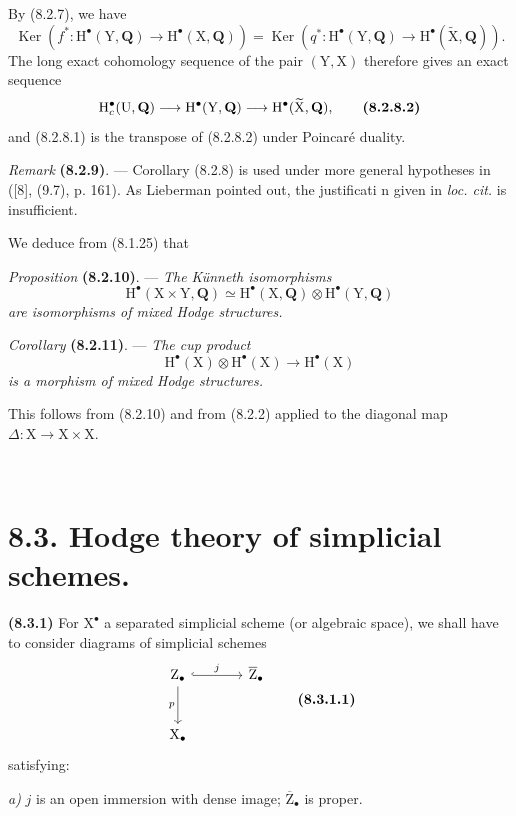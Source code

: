 \documentclass[11pt,leqno]{article}
\newcommand{\Page}[1]{\ifvmode\noindent\else\unskip\ \fi{\footnotesize\textcolor{gray}{[p.\,#1]}}\ \ignorespaces}
\begin{document}
By (8.2.7), we have
\[
\operatorname{Ker}(f^*:\mathrm{H}^\bullet(\mathrm{Y},\mathbf{Q})
 \to\mathrm{H}^\bullet(\mathrm{X},\mathbf{Q}))
=
\operatorname{Ker}(q^*:\mathrm{H}^\bullet(\mathrm{Y},\mathbf{Q})
 \to\mathrm{H}^\bullet(\widetilde{\mathrm{X}},\mathbf{Q})).
\]
The long exact cohomology sequence of the pair \((\mathrm{Y},\mathrm{X})\) therefore gives an exact sequence
\[
\mathrm{H}_c^\bullet(\mathrm{U},\mathbf{Q})
\longrightarrow\mathrm{H}^\bullet(\mathrm{Y},\mathbf{Q})
\longrightarrow\mathrm{H}^\bullet(\widetilde{\mathrm{X}},\mathbf{Q}),
\tag*{\textbf{(8.2.8.2)}}
\]
and (8.2.8.1) is the transpose of (8.2.8.2) under Poincaré duality.

\textit{Remark} \textbf{(8.2.9)}. — Corollary (8.2.8) is used under more general hypotheses in ([8], (9.7), p. 161). As Lieberman pointed out, the justificati n given in \textit{loc. cit.} is insufficient.

We deduce from (8.1.25) that

\textit{Proposition} \textbf{(8.2.10)}. — \textit{The Künneth isomorphisms}
\[
\mathrm{H}^\bullet(\mathrm{X}\times\mathrm{Y},\mathbf{Q})
\simeq
\mathrm{H}^\bullet(\mathrm{X},\mathbf{Q})
\otimes\mathrm{H}^\bullet(\mathrm{Y},\mathbf{Q})
\]
\textit{are isomorphisms of mixed Hodge structures.}

\textit{Corollary} \textbf{(8.2.11)}. — \textit{The cup product}
\[
\mathrm{H}^\bullet(\mathrm{X})\otimes\mathrm{H}^\bullet(\mathrm{X})
\longrightarrow\mathrm{H}^\bullet(\mathrm{X})
\]
\textit{is a morphism of mixed Hodge structures.}

This follows from (8.2.10) and from (8.2.2) applied to the diagonal map \(\Delta:\mathrm{X}\to\mathrm{X}\times\mathrm{X}\).

\Page{41}
\section*{8.3. Hodge theory of simplicial schemes.}

\textbf{(8.3.1)} For \(\mathrm{X}^\bullet\) a separated simplicial scheme (or algebraic space), we shall have to consider diagrams of simplicial schemes
\[
\begin{tikzcd}[column sep=large,row sep=large]
\mathrm{Z}_\bullet \arrow[r,hook,"j"] \arrow[d,"p"']
 & \overline{\mathrm{Z}}_\bullet\\
\mathrm{X}_\bullet &
\end{tikzcd}
\tag*{\textbf{(8.3.1.1)}}
\]
satisfying:

\textit{a)} \(j\) is an open immersion with dense image; \(\overline{\mathrm{Z}}_\bullet\) is proper.
\end{document}
